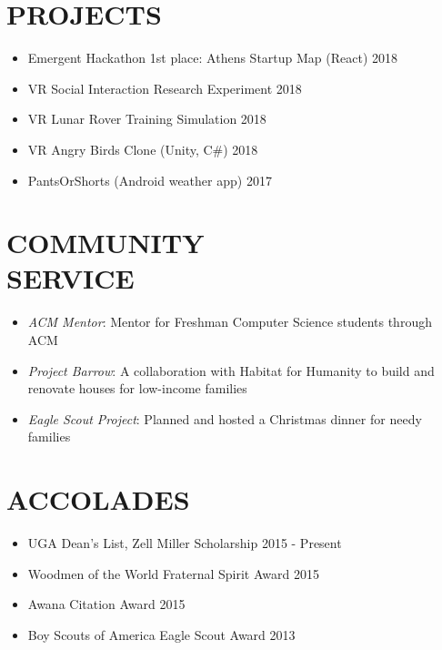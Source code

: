 \documentclass[line,margin]{res}
\begin{document}
\begin{resume}
 \section{PROJECTS}
             \begin{itemize} \itemsep -2pt
             \item Emergent Hackathon 1st place: Athens Startup Map (React) \hfill 2018
             \item VR Social Interaction Research Experiment \hfill 2018
             \item VR Lunar Rover Training Simulation \hfill 2018
             \item VR Angry Birds Clone (Unity, C$\#$) \hfill 2018
             \item PantsOrShorts (Android weather app) \hfill 2017
	    \end{itemize}
	    
	    
\section{COMMUNITY \\ SERVICE} 
            \begin{itemize} \itemsep -2pt
            \item \textit{ACM Mentor}: Mentor for Freshman Computer Science students through ACM
	    \item \textit{Project Barrow}: A collaboration with Habitat for Humanity to build and renovate houses for low-income families
	    \item \textit{Eagle Scout Project}: Planned and hosted a Christmas dinner for needy families
	    \end{itemize}
\section{ACCOLADES}             
            \begin{itemize} \itemsep -2pt
            \item UGA Dean's List, Zell Miller Scholarship \hfill 2015 - Present
            \item Woodmen of the World Fraternal Spirit Award \hfill 2015
            \item Awana Citation Award \hfill 2015
            \item Boy Scouts of America Eagle Scout Award \hfill 2013
            \end{itemize}    
         
 

\end{resume}
\end{document}
